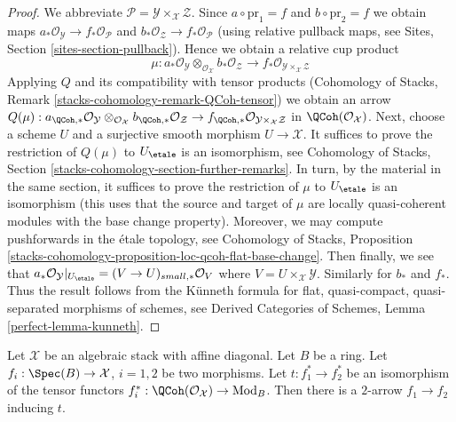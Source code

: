\begin{proof}
We abbreviate $\mathcal{P} = \mathcal{Y} \times_\mathcal{X} \mathcal{Z}$.
Since $a \circ \text{pr}_1 = f$ and $b \circ \text{pr}_2 = f$
we obtain maps $a_*\mathcal{O}_\mathcal{Y} \to f_*\mathcal{O}_\mathcal{P}$
and $b_*\mathcal{O}_\mathcal{Z} \to f_*\mathcal{O}_\mathcal{P}$ (using
relative pullback maps, see Sites, Section \ref{sites-section-pullback}).
Hence we obtain a relative cup product
$$
\mu :
a_*\mathcal{O}_\mathcal{Y}
\otimes_{\mathcal{O}_\mathcal{X}}
b_*\mathcal{O}_\mathcal{Z} \longrightarrow
f_*\mathcal{O}_{\mathcal{Y} \times_\mathcal{X} \mathcal{Z}}
$$
Applying $Q$ and its compatibility with tensor products
(Cohomology of Stacks, Remark \ref{stacks-cohomology-remark-QCoh-tensor})
we obtain an arrow
$Q(\mu) : a_{\QCoh, *}\mathcal{O}_\mathcal{Y}
\otimes_{\mathcal{O}_\mathcal{X}}
b_{\QCoh, *}\mathcal{O}_\mathcal{Z} \to
f_{\QCoh, *}\mathcal{O}_{\mathcal{Y} \times_\mathcal{X} \mathcal{Z}}$
in $\QCoh(\mathcal{O}_\mathcal{X})$.
Next, choose a scheme $U$ and a surjective smooth morphism
$U \to \mathcal{X}$. It suffices to prove the restriction of
$Q(\mu)$ to $U_\etale$ is an isomorphism, see
Cohomology of Stacks, Section \ref{stacks-cohomology-section-further-remarks}.
In turn, by the material in the same section,
it suffices to prove the restriction of $\mu$ to $U_\etale$
is an isomorphism (this uses that the source and target of $\mu$
are locally quasi-coherent modules with the base change property).
Moreover, we may compute pushforwards in the \'etale topology, see
Cohomology of Stacks, Proposition
\ref{stacks-cohomology-proposition-loc-qcoh-flat-base-change}.
Then finally, we see that
$a_*\mathcal{O}_\mathcal{Y}|_{U_\etale} = (V \to U)_{small, *}\mathcal{O}_V$
where $V = U \times_\mathcal{X} \mathcal{Y}$.
Similarly for $b_*$ and $f_*$. Thus the result follows
from the K\"unneth formula for flat, quasi-compact, quasi-separated
morphisms of schemes, see Derived Categories of Schemes,
Lemma \ref{perfect-lemma-kunneth}.
\end{proof}

\begin{lemma}
\label{lemma-fully-faithful}
Let $\mathcal{X}$ be an algebraic stack with affine diagonal.
Let $B$ be a ring. Let $f_i : \Spec(B) \to \mathcal{X}$, $i = 1, 2$
be two morphisms. Let $t : f_1^* \to f_2^*$ be an isomorphism
of the tensor functors
$f_i^* : \QCoh(\mathcal{O}_\mathcal{X}) \to \text{Mod}_B$.
Then there is a $2$-arrow $f_1 \to f_2$ inducing $t$.
\end{lemma}

